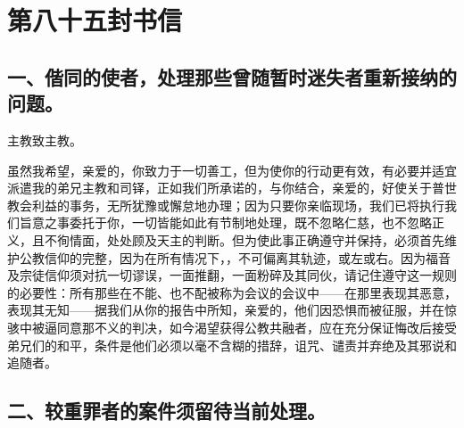 

\section{第八十五封书信}

\par


\subsection{一、偕同的使者，处理那些曾随暂时迷失者重新接纳的问题。}

主教致主教。\par

虽然我希望，亲爱的，你致力于一切善工，但为使你的行动更有效，有必要并适宜派遣我的弟兄主教和司铎，正如我们所承诺的，与你结合，亲爱的，好使关于普世教会利益的事务，无所犹豫或懈怠地办理；因为只要你亲临现场，我们已将执行我们旨意之事委托于你，一切皆能如此有节制地处理，既不忽略仁慈，也不忽略正义，且不徇情面，处处顾及天主的判断。但为使此事正确遵守并保持，必须首先维护公教信仰的完整，因为在所有情况下，，不可偏离其轨迹，或左或右。因为福音及宗徒信仰须对抗一切谬误，一面推翻，一面粉碎及其同伙，请记住遵守这一规则的必要性：所有那些在不能、也不配被称为会议的会议中——在那里表现其恶意，表现其无知——据我们从你的报告中所知，亲爱的，他们因恐惧而被征服，并在惊骇中被逼同意那不义的判决，如今渴望获得公教共融者，应在充分保证悔改后接受弟兄们的和平，条件是他们必须以毫不含糊的措辞，诅咒、谴责并弃绝及其邪说和追随者。\par


\subsection{二、较重罪者的案件须留待当前处理。}

